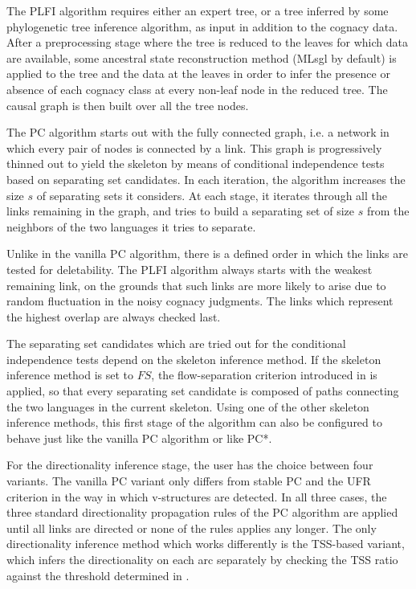 The PLFI algorithm requires either an expert tree, or a tree inferred by some phylogenetic tree inference algorithm, as input in addition to the cognacy data. After a preprocessing stage where the tree is reduced to the leaves for which data are available, some ancestral state reconstruction method (MLsgl by default) is applied to the tree and the data at the leaves in order to infer the presence or absence of each cognacy class at every non-leaf node in the reduced tree. The causal graph is then built over all the tree nodes.

The PC algorithm starts out with the fully connected graph, i.e. a network in which every pair of nodes is connected by a link. This graph is progressively thinned out to yield the skeleton by means of conditional independence tests based on separating set candidates. In each iteration, the algorithm increases the size $s$ of separating sets it considers. At each stage, it iterates through all the links remaining in the graph, and tries to build a separating set of size $s$ from the neighbors of the two languages it tries to separate.

Unlike in the vanilla PC algorithm, there is a defined order in which the links are tested for deletability. The PLFI algorithm always starts with the weakest remaining link, on the grounds that such links are more likely to arise due to random fluctuation in the noisy cognacy judgments. The links which represent the highest overlap are always checked last.

The separating set candidates which are tried out for the conditional independence tests depend on the skeleton inference method. If the skeleton inference method is set to $FS$, the flow-separation criterion introduced in  is applied, so that every separating set candidate is composed of paths connecting the two languages in the current skeleton. Using one of the other skeleton inference methods, this first stage of the algorithm can also be configured to behave just like the vanilla PC algorithm or like PC*.

For the directionality inference stage, the user has the choice between four variants. The vanilla PC variant only differs from stable PC and the UFR criterion in the way in which v-structures are detected. In all three cases, the three standard directionality propagation rules of the PC algorithm are applied until all links are directed or none of the rules applies any longer. The only directionality inference method which works differently is the TSS-based variant, which infers the directionality on each arc separately by checking the TSS ratio against the threshold determined in . 


